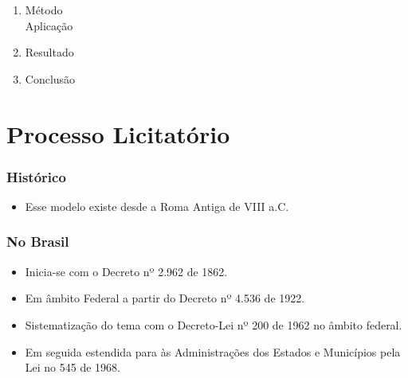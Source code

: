 \documentclass{beamer}
\begin{document}
\begin{frame}
\begin{enumerate}
			\item Método\\
			\textcolor{ExecusharesGrey}{\footnotesize\hspace{1em} Aplicação}\\			 
			\item Resultado\\ 
			\item Conclusão\\
		\end{enumerate}
	\end{frame}

	\setcounter{framenumber}{0}
	\setcounter{showProgressBar}{2}
	\setcounter{showSlideNumbers}{2}
	
	\section{Processo Licitatório}
	
		\begin{frame}\frametitle{Histórico}
			\begin{itemize}
				\item Esse modelo existe desde a Roma Antiga de VIII a.C.
			\end{itemize}
		\end{frame}

		\begin{frame} \frametitle{No Brasil}
			\begin{itemize}
				\item Inicia-se com o Decreto nº 2.962 de 1862.
				\item Em âmbito Federal a partir do Decreto nº 4.536 de 1922.
				\item Sistematização do tema com o Decreto-Lei nº 200 de 1962 no âmbito federal.
				\item Em seguida estendida para às Administrações dos Estados e
				Municípios pela Lei no 545 de 1968.
			\end{itemize}
		\end{frame}
		
\end{document}
